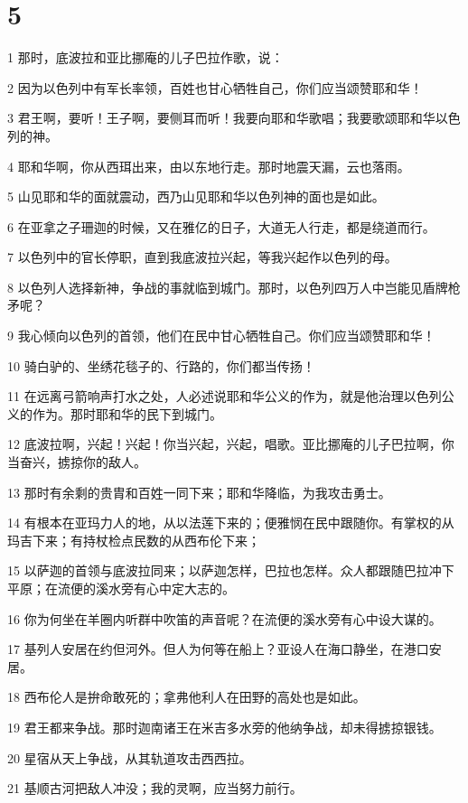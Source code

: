 \chapter{5}

\par 1 那时，底波拉和亚比挪庵的儿子巴拉作歌，说：
\par 2 因为以色列中有军长率领，百姓也甘心牺牲自己，你们应当颂赞耶和华！
\par 3 君王啊，要听！王子啊，要侧耳而听！我要向耶和华歌唱；我要歌颂耶和华以色列的神。
\par 4 耶和华啊，你从西珥出来，由以东地行走。那时地震天漏，云也落雨。
\par 5 山见耶和华的面就震动，西乃山见耶和华以色列神的面也是如此。
\par 6 在亚拿之子珊迦的时候，又在雅亿的日子，大道无人行走，都是绕道而行。
\par 7 以色列中的官长停职，直到我底波拉兴起，等我兴起作以色列的母。
\par 8 以色列人选择新神，争战的事就临到城门。那时，以色列四万人中岂能见盾牌枪矛呢？
\par 9 我心倾向以色列的首领，他们在民中甘心牺牲自己。你们应当颂赞耶和华！
\par 10 骑白驴的、坐绣花毯子的、行路的，你们都当传扬！
\par 11 在远离弓箭响声打水之处，人必述说耶和华公义的作为，就是他治理以色列公义的作为。那时耶和华的民下到城门。
\par 12 底波拉啊，兴起！兴起！你当兴起，兴起，唱歌。亚比挪庵的儿子巴拉啊，你当奋兴，掳掠你的敌人。
\par 13 那时有余剩的贵胄和百姓一同下来；耶和华降临，为我攻击勇士。
\par 14 有根本在亚玛力人的地，从以法莲下来的；便雅悯在民中跟随你。有掌权的从玛吉下来；有持杖检点民数的从西布伦下来；
\par 15 以萨迦的首领与底波拉同来；以萨迦怎样，巴拉也怎样。众人都跟随巴拉冲下平原；在流便的溪水旁有心中定大志的。
\par 16 你为何坐在羊圈内听群中吹笛的声音呢？在流便的溪水旁有心中设大谋的。
\par 17 基列人安居在约但河外。但人为何等在船上？亚设人在海口静坐，在港口安居。
\par 18 西布伦人是拚命敢死的；拿弗他利人在田野的高处也是如此。
\par 19 君王都来争战。那时迦南诸王在米吉多水旁的他纳争战，却未得掳掠银钱。
\par 20 星宿从天上争战，从其轨道攻击西西拉。
\par 21 基顺古河把敌人冲没；我的灵啊，应当努力前行。
